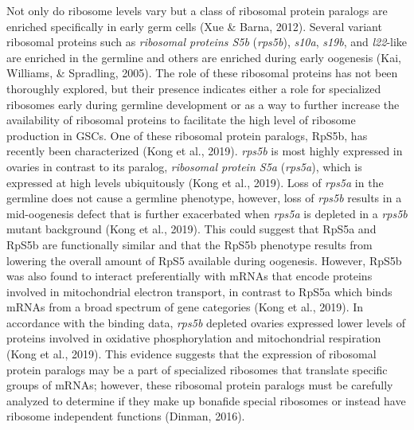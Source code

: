 \documentclass[12pt,oneside]{reedthesis}
\begin{document}
Not only do ribosome levels vary but a class of ribosomal protein
paralogs are enriched specifically in early germ cells (Xue \& Barna, 2012).
Several variant ribosomal proteins such as \emph{ribosomal proteins S5b}
(\emph{rps5b}), \emph{s10a}, \emph{s19b}, and \emph{l22}-like are enriched in the germline
and others are enriched during early oogenesis (Kai, Williams, \& Spradling, 2005). The role
of these ribosomal proteins has not been thoroughly explored, but their
presence indicates either a role for specialized ribosomes early during
germline development or as a way to further increase the availability of
ribosomal proteins to facilitate the high level of ribosome production
in GSCs. One of these ribosomal protein paralogs, RpS5b, has recently
been characterized (Kong et al., 2019). \emph{rps5b} is most highly expressed in
ovaries in contrast to its paralog, \emph{ribosomal protein S5a} (\emph{rps5a}),
which is expressed at high levels ubiquitously (Kong et al., 2019). Loss of
\emph{rps5a} in the germline does not cause a germline phenotype, however,
loss of \emph{rps5b} results in a mid-oogenesis defect that is further
exacerbated when \emph{rps5a} is depleted in a \emph{rps5b} mutant background
(Kong et al., 2019). This could suggest that RpS5a and RpS5b are functionally
similar and that the RpS5b phenotype results from lowering the overall
amount of RpS5 available during oogenesis. However, RpS5b was also found
to interact preferentially with mRNAs that encode proteins involved in
mitochondrial electron transport, in contrast to RpS5a which binds mRNAs
from a broad spectrum of gene categories (Kong et al., 2019). In accordance
with the binding data, \emph{rps5b} depleted ovaries expressed lower levels
of proteins involved in oxidative phosphorylation and mitochondrial
respiration (Kong et al., 2019). This evidence suggests that the expression
of ribosomal protein paralogs may be a part of specialized ribosomes
that translate specific groups of mRNAs; however, these ribosomal
protein paralogs must be carefully analyzed to determine if they make up
bonafide special ribosomes or instead have ribosome independent
functions (Dinman, 2016).
\end{document}
